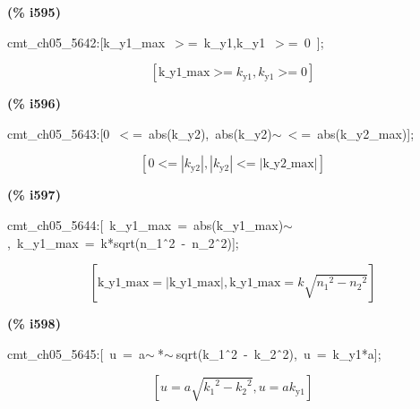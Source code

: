 \documentclass[fleqn]{article}
\begin{document}
\noindent
\begin{minipage}[t]{4.000000em}\color{red}\bfseries
(\% i595)	
\end{minipage}
\begin{minipage}[t]{\textwidth}\color{blue}
cmt\_ch05\_5642:[k\_y1\_max\ \ensuremath{>}=\ k\_y1,k\_y1\ \ensuremath{>}=\ 0\ ];
\end{minipage}
\[\displaystyle \tag{\% o595} 
\left[ \ensuremath{\mathrm{k\_ y1\_ max}}\operatorname{>  =}{k_{\ensuremath{\mathrm{y1}}}}\operatorname{,}{k_{\ensuremath{\mathrm{y1}}}}\operatorname{>  =}0\right] \mbox{}
\]


\noindent
\begin{minipage}[t]{4.000000em}\color{red}\bfseries
(\% i596)	
\end{minipage}
\begin{minipage}[t]{\textwidth}\color{blue}
cmt\_ch05\_5643:[0\ \ensuremath{<}=\ abs(k\_y2),\ abs(k\_y2)\ensuremath{\sim\ }\ensuremath{<}=\ abs(k\_y2\_max)];
\end{minipage}
\[\displaystyle \tag{\% o596} 
\left[ 0\operatorname{<  =}\left| {k_{\ensuremath{\mathrm{y2}}}}\right| \operatorname{,}\left| {k_{\ensuremath{\mathrm{y2}}}}\right| \operatorname{<  =}\left| \ensuremath{\mathrm{k\_ y2\_ max}}\right| \right] \mbox{}
\]


\noindent
\begin{minipage}[t]{4.000000em}\color{red}\bfseries
(\% i597)	
\end{minipage}
\begin{minipage}[t]{\textwidth}\color{blue}
cmt\_ch05\_5644:[\ k\_y1\_max\ =\ abs(k\_y1\_max)\ensuremath{\sim\ },\ k\_y1\_max\ =\ k*sqrt(n\_1\^\ 2\ -\ n\_2\^\ 2)];
\end{minipage}
\[\displaystyle \tag{\% o597} 
\left[ \ensuremath{\mathrm{k\_ y1\_ max}}=\left| \ensuremath{\mathrm{k\_ y1\_ max}}\right| \operatorname{,}\ensuremath{\mathrm{k\_ y1\_ max}}=k \sqrt{{{{n_1}}^{2}}-{{{n_2}}^{2}}}\right] \mbox{}
\]


\noindent
\begin{minipage}[t]{4.000000em}\color{red}\bfseries
(\% i598)	
\end{minipage}
\begin{minipage}[t]{\textwidth}\color{blue}
cmt\_ch05\_5645:[\ u\ =\ a\ensuremath{\sim\ }*\ensuremath{\sim\ }sqrt(k\_1\^\ 2\ -\ k\_2\^\ 2),\ u\ =\ k\_y1*a];
\end{minipage}
\[\displaystyle \tag{\% o598} 
\left[ u=a \sqrt{{{{k_1}}^{2}}-{{{k_2}}^{2}}}\operatorname{,}u=a {k_{\ensuremath{\mathrm{y1}}}}\right] \mbox{}
\]
\end{document}
